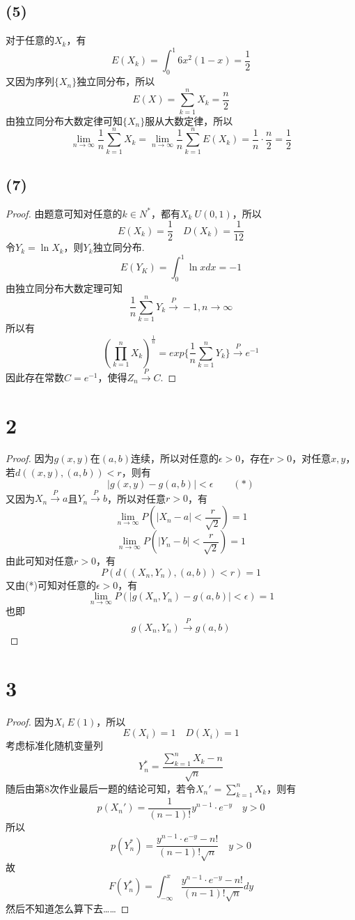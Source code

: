 \documentclass[twocolumn]{article}
\begin{document}
\begin{CJK}{UTF8}{gbsn}
			\subsection*{(5)}
				对于任意的$X_k$，有\[E(X_k)=\int_{0}^{1}6x^2(1-x)=\frac{1}{2}\]又因为序列$\{X_n\}$独立同分布，所以\[E(X)=\sum_{k=1}^{n}X_k = \frac{n}{2}\]由独立同分布大数定律可知$\{X_n\}$服从大数定律，所以\[\lim\limits_{n\to\infty}\frac{1}{n}\sum_{k=1}^{n}X_k=\lim\limits_{n\to\infty}\frac{1}{n}\sum_{k=1}^{n}E(X_k)=\frac{1}{n}\cdot\frac{n}{2}=\frac{1}{2}\]
			\subsection*{(7)}
				\begin{proof}
					由题意可知对任意的$k\in N^*$，都有$X_k~U(0,1)$，所以\[E(X_k)=\frac{1}{2}\quad D(X_k)=\frac{1}{12}\]令$Y_k=\ln X_k$，则$Y_k$独立同分布.\[E(Y_K)=\int_{0}^{1}\ln xdx = -1\]由独立同分布大数定理可知\[\frac{1}{n}\sum_{k=1}^{n}Y_k\xrightarrow{P}-1,n\to\infty\]所以有\[(\prod_{k=1}^{n}X_k)^{\frac{1}{n}}=exp\{\frac{1}{n}\sum_{k=1}^{n}Y_k\}\xrightarrow{P}e^{-1}\]因此存在常数$C=e^{-1}$，使得$Z_n\xrightarrow{P}C$.
				\end{proof}
			\section*{2}
				\begin{proof}
					因为$g(x,y)$在$(a,b)$连续，所以对任意的$\epsilon>0$，存在$r>0$，对任意$x,y$，若$d((x,y),(a,b))<r$，则有\[|g(x,y)-g(a,b)|<\epsilon\qquad(*)\]又因为$X_n\xrightarrow{P}a$且$Y_n\xrightarrow{P}b$，所以对任意$r>0$，有\[\lim\limits_{n\to\infty}P(|X_n-a|<\frac{r}{\sqrt{2}})=1\]\[\lim\limits_{n\to\infty}P(|Y_n-b|<\frac{r}{\sqrt{2}})=1\]由此可知对任意$r>0$，有\[P(d((X_n,Y_n),(a,b))<r)=1\]又由(*)可知对任意的$\epsilon>0$，有\[\lim\limits_{n\to\infty}P(|g(X_n,Y_n)-g(a,b)|<\epsilon)=1\]也即\[g(X_n,Y_n)\xrightarrow{P}g(a,b)\]
				\end{proof}
			\section*{3}
				\begin{proof}
					因为$X_i~E(1)$，所以\[E(X_i)=1\quad D(X_i)=1\]考虑标准化随机变量列\[Y_n^*=\frac{\sum_{k=1}^{n}X_k-n}{\sqrt{n}}\]随后由第8次作业最后一题的结论可知，若令$X_n'=\sum_{k=1}^{n}X_k$，则有\[p(X_n')=\frac{1}{(n-1)!}y^{n-1}\cdot e^{-y}\quad y>0\]所以\[p(Y_n^*)=\frac{y^{n-1}\cdot e^{-y}-n!}{(n-1)!\sqrt{n}}\quad y>0\]故\[F(Y_n^*)=\int_{-\infty}^{x}\frac{y^{n-1}\cdot e^{-y}-n!}{(n-1)!\sqrt{n}}dy\]然后不知道怎么算下去……
				\end{proof}
				
	\end{CJK}
\end{document}
